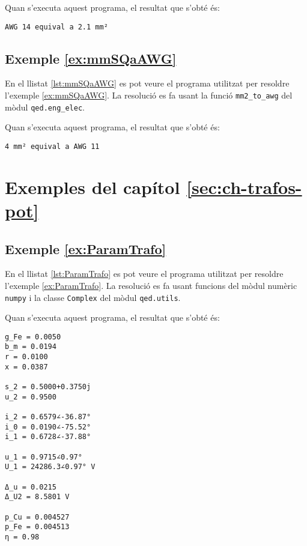 Quan s'executa aquest programa, el resultat que s'obté és:
\lstset{
	language=,
	numbers=none,
	frame=none
}
\begin{lstlisting}
AWG 14 equival a 2.1 mm²
\end{lstlisting} 



\hypertarget{exemple:mmSQaAWG}{\subsection{Exemple \ref*{ex:mmSQaAWG} \mmSQaAWG}}
En el llistat \vref{lst:mmSQaAWG} es pot veure el programa utilitzat per resoldre l'exemple \vref{ex:mmSQaAWG}. La resolució es fa usant la funció \texttt{mm2\_to\_awg} del mòdul \texttt{qed.eng\_elec}.


Quan s'executa aquest programa, el resultat que s'obté és:
\lstset{
	language=,
	numbers=none,
	frame=none
}
\begin{lstlisting}
4 mm² equival a AWG 11
\end{lstlisting} 





\section{Exemples del capítol \ref*{sec:ch-trafos-pot}}

\hypertarget{exemple:ParamTrafo}{\subsection{Exemple \ref*{ex:ParamTrafo} \ParamTrafo}}
En el llistat \vref{lst:ParamTrafo} es pot veure el programa utilitzat per resoldre l'exemple \vref{ex:ParamTrafo}. La resolució es fa usant funcions del mòdul numèric \texttt{numpy} i la classe  \texttt{Complex} del mòdul \texttt{qed.utils}.


Quan s'executa aquest programa, el resultat que s'obté és:
\lstset{
	language=,
	numbers=none,
	frame=none
}
\begin{lstlisting}
g_Fe = 0.0050
b_m = 0.0194
r = 0.0100
x = 0.0387

s_2 = 0.5000+0.3750j
u_2 = 0.9500

i_2 = 0.6579∠-36.87°
i_0 = 0.0190∠-75.52°
i_1 = 0.6728∠-37.88°

u_1 = 0.9715∠0.97°
U_1 = 24286.3∠0.97° V

Δ_u = 0.0215
Δ_U2 = 8.5801 V

p_Cu = 0.004527
p_Fe = 0.004513
η = 0.98
\end{lstlisting} 

